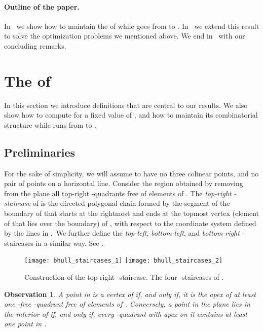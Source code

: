 \documentclass[11pt,letterpaper,english]{article}
\newtheorem{obs}[theorem]{Observation}
\theoremstyle{definition}
\begin{document}
\paragraph{Outline of the paper.}

In~ we show how to maintain the  of  while
 goes from  to . In~ we extend
this result to solve the optimization problems we mentioned above. We
end in~ with our concluding remarks.

\section{The  of }\label{sec:bhull}

In this section we introduce definitions that are central to our
results. We also show how to compute  for a fixed value of
, and how to maintain its combinatorial structure while  runs
from  to .

\subsection{Preliminaries}\label{sec:bhull:preliminaries}

For the sake of simplicity, we
will assume  to have no three colinear points, and no pair of
points on a horizontal line.
Consider the region  obtained by removing from the plane
all top-right -quadrants free of elements of . The
\emph{top-right -staircase} of  is the directed polygonal
chain formed by the segment of the boundary of  that
starts at the rightmost and ends at the topmost vertex (element of 
that lies over the boundary) of , with respect to the
coordinate system defined by the lines in .~We further define
the \emph{top-left}, \emph{bottom-left}, and \emph{bottom-right}
-staircases in a similar way. See .

\begin{figure}[ht]
  \centering
  \subcaptionbox{\label{bhull:fig:staircases:1}}
  {\texttt{[image: bhull\_staircases\_1]}}
  \hspace{1.5cm}
  \subcaptionbox{\label{bhull:fig:staircases:2}}
  {\texttt{[image: bhull\_staircases\_2]}}
  \caption{ Construction of the
    top-right -staircase.  The
    four -staircases of .}
  \label{bhull:fig:staircases}
\end{figure}

\begin{obs}\label{bhull:obs:maximal}
  A point in  is a vertex of  if, and only if, it is the
  apex of at least one -free -quadrant free of elements of
  . Conversely, a point in the plane lies in the interior of
   if, and only if, every -quadrant with apex on it
  contains at least one point in .
\end{obs}
\end{document}
